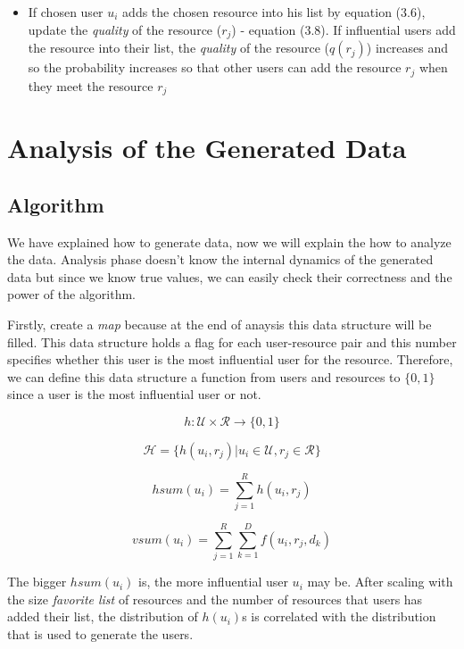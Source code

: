 \documentclass[12pt,a4paper]{report}
\begin{document}
\begin{itemize}
\begin{itemize}
\begin{itemize}
		\item If chosen user $u_{i}$ adds the chosen resource into his list by equation ($3.6$), update the \emph{quality} of the resource ($r_{j}$) - equation ($3.8$). If influential users add the resource into their list, the \emph{quality} of the resource ($q(r_{j})$) increases and so the probability increases so that other users can add the resource  $r_{j}$ when they meet the resource $r_{j}$

		\end{itemize}

	\end{itemize}

\end{itemize}	

\chapter{Analysis of the Generated Data}

	\section{Algorithm}

	\hspace{0.6cm} We have explained how to generate data, now we will explain the how to analyze the data. Analysis phase doesn't know the internal dynamics of the generated data but since we know true values, we can easily check their correctness and the power of the algorithm.

	\hspace{0.6cm}Firstly, create a \emph{map} because at the end of anaysis this data structure will be filled. This data structure holds a flag for each user-resource pair and this number specifies whether this user is the most influential user for the resource. Therefore, we can define this data structure a function from users and resources to $\{0,1\}$ since a user is the most influential user or not.

	$$h : \mathcal{U} \times \mathcal{R} \rightarrow \{0, 1\}$$

	$$ \mathcal{H} = \{h(u_{i}, r_{j})| u_{i} \in \mathcal{U}, r_{j} \in \mathcal{R}\}$$
	
	$$hsum(u_{i}) = \sum_{j=1}^R h(u_{i}, r_{j})$$

	$$vsum(u_{i}) = \sum_{j=1}^R \sum_{k=1}^D f(u_{i}, r_{j}, d_{k}) $$

	The bigger $hsum(u_{i})$ is, the more influential user $u_{i}$ may be. After scaling with the size \emph{favorite list} of resources and the number of resources that users has added their list, the distribution of $h(u_{i})$s is correlated with the distribution that is used to generate the users.
\end{document}
